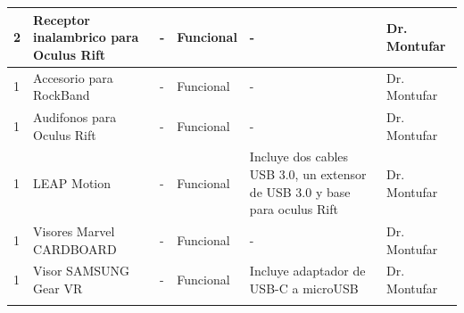 \documentclass[a4paper,11pt]{article}                 %
\begin{document}
\begin{longtable}{|p{}|p{}|p{}|p{}|p{}|p{}|}
2                          & Receptor inalambrico para Oculus Rift     & -                                                                            & Funcional                & -                                                                          & Dr. Montufar                                                                      \\ \hline
1                          & Accesorio para RockBand                   & -                                                                            & Funcional                & -                                                                          & Dr. Montufar                                                                      \\ \hline
1                          & Audifonos para Oculus Rift                & -                                                                            & Funcional                & -                                                                          & Dr. Montufar                                                                      \\ \hline
1                          & LEAP Motion                               & -                                                                            & Funcional                & Incluye dos cables USB 3.0, un extensor de USB 3.0 y base para oculus Rift & Dr. Montufar                                                                      \\ \hline
1                          & Visores Marvel CARDBOARD                  & -                                                                            & Funcional                & -                                                                          & Dr. Montufar                                                                      \\ \hline
1                          & Visor SAMSUNG Gear VR                     & -                                                                            & Funcional                & Incluye adaptador de USB-C a microUSB                                      & Dr. Montufar                                                                      \\ \hline
\hline
                           &                                           &                                                                              &                          &                                                                            &                                                                                   \\

\end{longtable}
\end{document}
